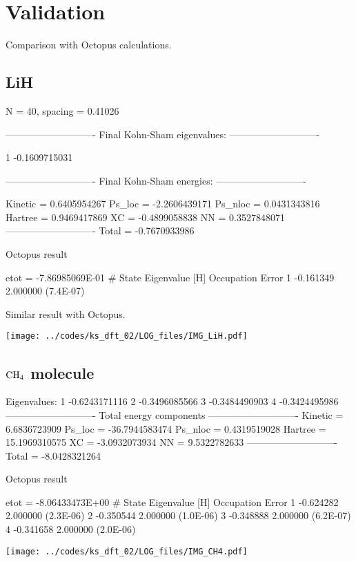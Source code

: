 \section{Validation}

Comparison with Octopus calculations.

\subsection{LiH}

N = 40, spacing = 0.41026
\begin{textcode}
----------------------------
Final Kohn-Sham eigenvalues:
----------------------------

  1      -0.1609715031

----------------------------
Final Kohn-Sham energies:
----------------------------

Kinetic =       0.6405954267
Ps_loc  =      -2.2606439171
Ps_nloc =       0.0431343816
Hartree =       0.9469417869
XC      =      -0.4899058838
NN      =       0.3527848071
----------------------------
Total   =      -0.7670933986
\end{textcode}

Octopus result
\begin{textcode}
 etot  = -7.86985069E-01
#  State  Eigenvalue [H]  Occupation    Error
      1       -0.161349    2.000000   (7.4E-07)
\end{textcode}


Similar result with Octopus.

{\centering
\texttt{[image: ../codes/ks\_dft\_02/LOG\_files/IMG\_LiH.pdf]}
}



\subsection{$\ce{CH4}$ molecule}

\begin{textcode}
Eigenvalues:
  1      -0.6243171116
  2      -0.3496085566
  3      -0.3484490903
  4      -0.3424495986
----------------------------
Total energy components
----------------------------
Kinetic =       6.6836723909
Ps_loc  =     -36.7944583474
Ps_nloc =       0.4319519028
Hartree =      15.1969310575
XC      =      -3.0932073934
NN      =       9.5322782633
----------------------------
Total   =      -8.0428321264 
\end{textcode}


Octopus result
\begin{textcode}
 etot  = -8.06433473E+00
#  State  Eigenvalue [H]  Occupation    Error
      1       -0.624282    2.000000   (2.3E-06)
      2       -0.350544    2.000000   (1.0E-06)
      3       -0.348888    2.000000   (6.2E-07)
      4       -0.341658    2.000000   (2.0E-06)   
\end{textcode}

{\centering
\texttt{[image: ../codes/ks\_dft\_02/LOG\_files/IMG\_CH4.pdf]}
}
